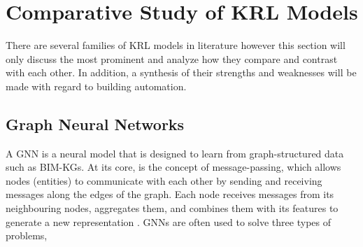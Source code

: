 \section{Comparative Study of \ac{KRL} Models}
\label{KRL models}
There are several families of \ac{KRL} models in literature however this section will only discuss the most prominent and analyze how they compare and contrast with each other. In addition, a synthesis of their strengths and weaknesses will be made with regard to building automation.

\subsection{Graph Neural Networks}
A \ac{GNN} is a neural model that is designed to learn from graph-structured data such as \acp{BIM-KG}. At its core, is the concept of message-passing, which allows nodes (entities) to communicate with each other by sending and receiving messages along the edges of the graph. Each node receives messages from its neighbouring nodes, aggregates them, and combines them with its features to generate a new representation \citep{Scarselli2009TheModel, Bronstein2016GeometricData}. \acp{GNN} are often used to solve three types of problems, 

